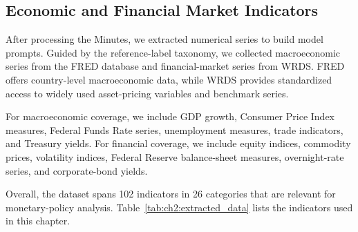     



\subsection*{Economic and Financial Market Indicators}

After processing the Minutes, we extracted numerical series to build model prompts. Guided by the reference-label taxonomy, we collected macroeconomic series from the FRED database and financial-market series from WRDS. FRED offers country-level macroeconomic data, while WRDS provides standardized access to widely used asset-pricing variables and benchmark series.

For macroeconomic coverage, we include GDP growth, Consumer Price Index measures, Federal Funds Rate series, unemployment measures, trade indicators, and Treasury yields. For financial coverage, we include equity indices, commodity prices, volatility indices, Federal Reserve balance-sheet measures, overnight-rate series, and corporate-bond yields.


Overall, the dataset spans 102 indicators in 26 categories that are relevant for monetary-policy analysis. Table~\ref{tab:ch2:extracted_data} lists the indicators used in this chapter.


